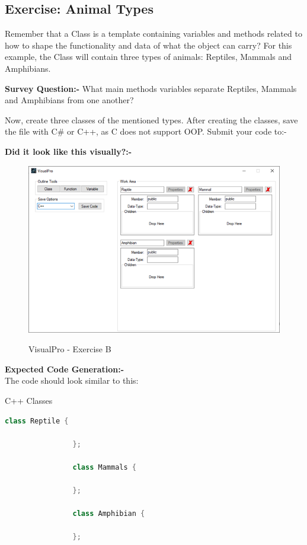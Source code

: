 \documentclass[10pt]{article}
\begin{document}
    \subsection{Exercise: Animal Types}
        Remember that a Class is a template containing variables and methods related to how to shape the functionality and data of what the object can carry? For this example, the Class will contain three types of animals: Reptiles, Mammals and Amphibians.
        
        \textbf{Survey Question:-} What main methods variables separate Reptiles, Mammals and Amphibians from one another?

        Now, create three classes of the mentioned types. After creating the classes, save the file with C\# or C++, as C does not support OOP. Submit your code to:-

        \textbf{Did it look like this visually?:-} 
        \begin{figure}[h]
            \centering
            {\includegraphics[scale=0.75]{Figures/Exercises/SecC-1.png}}
            \caption{VisualPro - Exercise B}
            \label{fig:vp-eB}
        \end{figure}

        \textbf{Expected Code Generation:-}\\
        The code should look similar to this:
        \begin{example}{C++ Classes}
            \begin{lstlisting}[language=c++]
                class Reptile {

                };

                class Mammals {

                };

                class Amphibian {

                };
            \end{lstlisting}
        \end{example}
\end{document}
